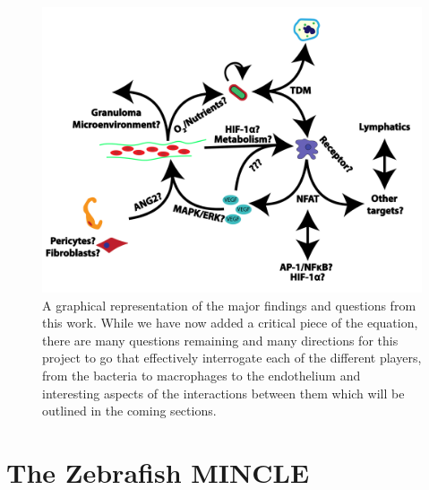 \begin{figure}
\centering
\includegraphics[width=\textwidth]{images/lingeringquestions.pdf}
\caption[Major findings and lingering questions]{A graphical representation of the major findings and questions from this work. While we have now added a critical piece of the equation, there are many questions remaining and many directions for this project to go that effectively interrogate each of the different players, from the bacteria to macrophages to the endothelium and interesting aspects of the interactions between them which will be outlined in the coming sections.}
\label{figure:lingeringquestions}
\end{figure}

\section{The Zebrafish MINCLE}\label{zfmincle}


